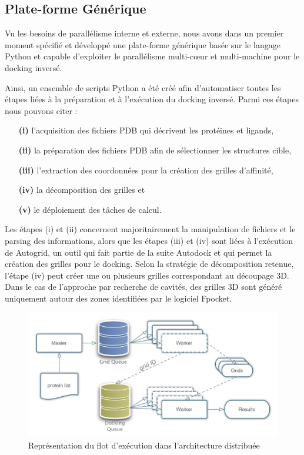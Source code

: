 \subsection{Plate-forme Générique}

Vu les besoins de parallélisme interne et externe, nous avons dans un premier moment spécifié et développé une plate-forme générique basée sur le langage Python et capable d'exploiter le parallélisme multi-c{\oe}ur et multi-machine pour le docking inversé. 

Ainsi, un ensemble de scripts Python a été créé afin d'automatiser toutes les étapes liées à la préparation et à l'exécution du docking inversé. Parmi ces étapes nous pouvons citer :
\begin{itemize}
	\item[\textbf{(i)}] l'acquisition des fichiers PDB qui décrivent les protéines et ligands, 
	\item[\textbf{(ii)}] la préparation des fichiers PDB afin de sélectionner les structures cible, 
	\item[\textbf{(iii)}] l'extraction des coordonnées pour la création des grilles d'affinité, 
	\item[\textbf{(iv)}] la décomposition des grilles et 
	\item[\textbf{(v)}] le déploiement des tâches de calcul. 
\end{itemize}

Les étapes (i) et (ii) concernent majoritairement la manipulation de fichiers et le parsing des informations, alors que les étapes  (iii) et (iv) sont liées à l'exécution de Autogrid, un outil qui fait partie de la suite Autodock et qui permet la création des grilles pour le docking. Selon la stratégie de décomposition retenue, l'étape (iv) peut créer une ou plusieurs grilles correspondant au découpage 3D. Dans le cas de l'approche par recherche de cavités, des grilles 3D sont généré uniquement autour des zones identifiées par le logiciel Fpocket. 


\begin{figure}
	\centering
		\includegraphics[width=0.5\linewidth]{images/Romain/fig3-color}
	\caption{Représentation du flot d'exécution dans l'architecture distribuée}\label{fig:romain-fig3}
\end{figure}


